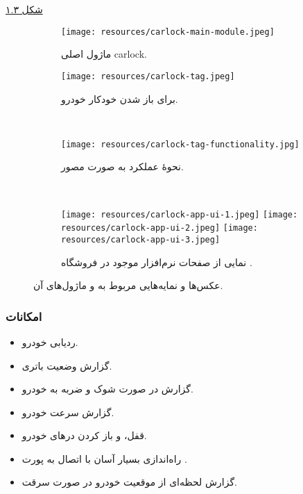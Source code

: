 \documentclass[a4paper,12pt]{report}
\begin{document}
	\hyperref[subfig2:fig2:subsec3:sec3:chap1]{
	شکل
	۱.۳}
	\begin{figure}[!h]
		\centering
		\footnotesize
		\begin{subfigure}[t]{0.3\linewidth}
			\centering
			\texttt{[image: resources/carlock-main-module.jpeg]}
			\caption{
				ماژول اصلی
				carlock.
			}
			\label{subfig1:fig1:subsec3:sec3:chap1}
		\end{subfigure}
		\hspace*{1cm}
		\begin{subfigure}[t]{0.3\linewidth}
			\centering
			\texttt{[image: resources/carlock-tag.jpeg]}
			\caption{
			برای باز شدن خودکار خودرو.
			}
			\label{subfig2:fig1:subsec3:sec3:chap1}
		\end{subfigure}\\
		\begin{subfigure}[t]{0.8\linewidth}
			\centering
			\texttt{[image: resources/carlock-tag-functionality.jpg]}
			\caption{
				نحوهٔ عملکرد
				به صورت مصور.
			}
			\label{subfig1:fig2:subsec3:sec3:chap1}
		\end{subfigure}\\\vspace*{5mm}

		\begin{subfigure}[t]{0.8\linewidth}
			\centering
			\texttt{[image: resources/carlock-app-ui-1.jpeg]}
			\texttt{[image: resources/carlock-app-ui-2.jpeg]}
			\texttt{[image: resources/carlock-app-ui-3.jpeg]}
			\caption{
				نمایی از صفحات نرم‌افزار
				موجود در فروشگاه
				.
			}
			\label{subfig2:fig2:subsec3:sec3:chap1}
		\end{subfigure}
		\normalsize
		\caption{
			عکس‌ها و نمایه‌هایی
			مربوط به
			و ماژول‌های آن.
		}
		\label{fig2:subsec3:sec3:chap1}
	\end{figure}
	\subsubsection{
		امکانات
	}\label{subsubsec3:subsec3:sec3:chap1}
	\begin{itemize}[nosep]\label{item1:subsec3:sec2:chap1}
		\item
			ردیابی خودرو.
		\item
			گزارش وضعیت باتری.
		\item
			گزارش در صورت شوک و ضربه به خودرو.
		\item
			گزارش سرعت خودرو.
		\item
			قفل، و باز کردن در‌های خودرو.
		\item
			راه‌اندازی بسیار آسان با اتصال به پورت
			.
		\item
			گزارش لحظه‌ای از موقعیت خودرو در صورت سرقت.

	\end{itemize}
\end{document}
